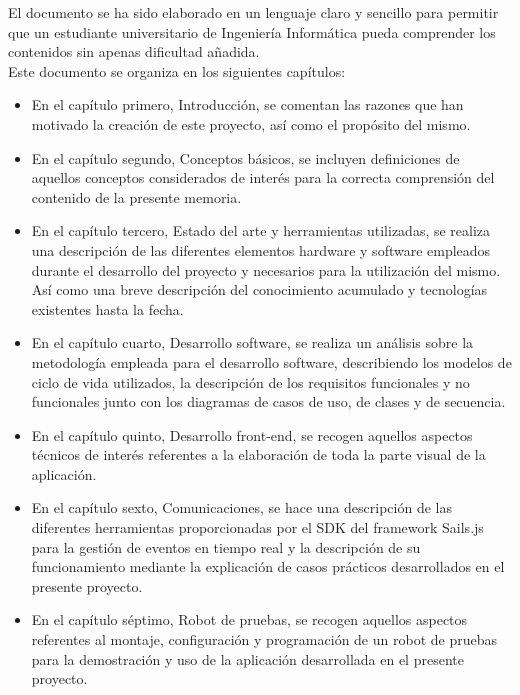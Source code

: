 \documentclass[a4paper,12pt]{article}
\begin{document}
El documento se ha sido elaborado en un lenguaje claro y sencillo para permitir que un estudiante universitario de Ingeniería Informática pueda comprender los contenidos sin apenas dificultad añadida.\\

Este documento se organiza en los siguientes capítulos:\\

\begin{itemize}

\item En el capítulo primero, Introducción, se comentan las razones que han motivado la creación de este proyecto, así como el propósito del mismo.

\item En el capítulo segundo, Conceptos básicos, se incluyen definiciones de aquellos conceptos considerados de interés para la correcta comprensión del contenido de la presente memoria.

\item En el capítulo tercero, Estado del arte y herramientas utilizadas, se realiza una descripción de las diferentes elementos hardware y software empleados durante el desarrollo del proyecto y necesarios para la utilización del mismo. Así como una breve descripción del conocimiento acumulado y tecnologías existentes hasta la fecha.

\item En el capítulo cuarto, Desarrollo software, se realiza un análisis sobre la metodología empleada para el desarrollo software, describiendo los modelos de ciclo de vida utilizados, la descripción de los requisitos funcionales y no funcionales junto con los diagramas de casos de uso, de clases y de secuencia.

\item En el capítulo quinto, Desarrollo front-end, se recogen aquellos aspectos técnicos de interés referentes a la elaboración de toda la parte visual de la aplicación.

\item En el capítulo sexto, Comunicaciones, se hace una descripción de las diferentes herramientas proporcionadas por el SDK del framework Sails.js para la gestión de eventos en tiempo real y la descripción de su funcionamiento mediante la explicación de casos prácticos desarrollados en el presente proyecto.

\item En el capítulo séptimo, Robot de pruebas, se recogen aquellos aspectos referentes al montaje, configuración y programación de un robot de pruebas para la demostración y uso de la aplicación desarrollada en el presente proyecto. 


\end{itemize}
\end{document}
